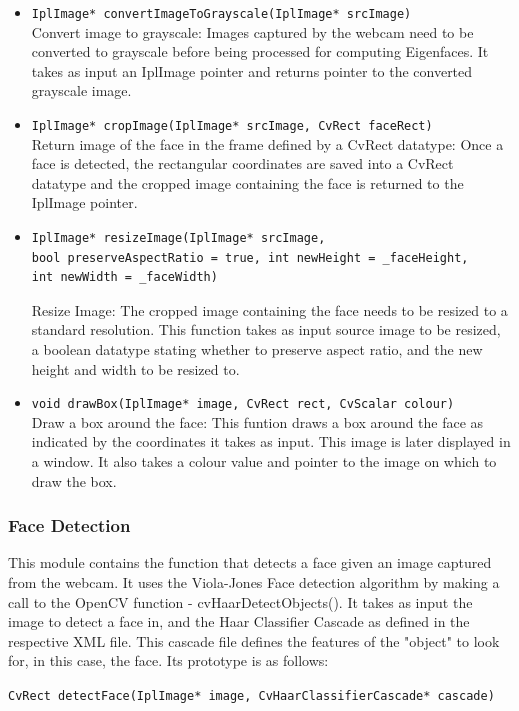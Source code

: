 \documentclass[12pt]{article}			%
\begin{document}
\begin{itemize}
\item 
\verb+IplImage* convertImageToGrayscale(IplImage* srcImage)+\\
Convert image to grayscale: Images captured by the webcam need to be converted to grayscale before being processed for computing Eigenfaces. It takes as input an IplImage pointer and returns pointer to the converted grayscale image.
\item
\verb+IplImage* cropImage(IplImage* srcImage, CvRect faceRect)+\\
Return image of the face in the frame defined by a CvRect datatype: Once a face is detected, the rectangular coordinates are saved into a CvRect datatype and the cropped image containing the face is returned to the IplImage pointer.
\item
\begin{verbatim}
IplImage* resizeImage(IplImage* srcImage,
bool preserveAspectRatio = true, int newHeight = _faceHeight,
int newWidth = _faceWidth)
\end{verbatim}
Resize Image: The cropped image containing the face needs to be resized to a standard resolution. This function takes as input source image to be resized, a boolean datatype stating whether to preserve aspect ratio, and the new height and width to be resized to.
\item
\verb+void drawBox(IplImage* image, CvRect rect, CvScalar colour)+\\
Draw a box around the face: This funtion draws a box around the face as indicated by the coordinates it takes as input. This image is later displayed in a window. It also takes a colour value and pointer to the image on which to draw the box.
\end{itemize}

\subsubsection { Face Detection }
This module contains the function that detects a face given an image captured from the webcam. It uses the Viola-Jones Face detection algorithm by making a call to the OpenCV function - cvHaarDetectObjects(). It takes as input the image to detect a face in, and the Haar Classifier Cascade as defined in the respective XML file. This cascade file defines the features of the "object" to look for, in this case, the face. Its prototype is as follows:
\begin{center}
\verb+CvRect detectFace(IplImage* image, CvHaarClassifierCascade* cascade)+
\end{center}
\end{document}
